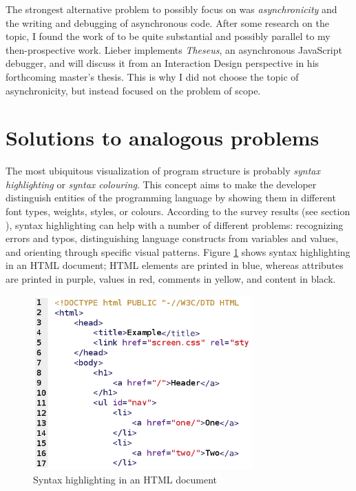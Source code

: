 The strongest alternative problem to possibly focus on was
\emph{asynchronicity} and the writing and debugging of asynchronous
code. After some research on the topic, I found the work of
 to be quite substantial and possibly parallel to my
then-prospective work. Lieber implements \emph{Theseus}, an asynchronous
JavaScript debugger, and will discuss it from an Interaction Design
perspective in his forthcoming master’s thesis. This is why I did not
choose the topic of asynchronicity, but instead focused on the problem
of scope.

\section{Solutions to analogous problems}\label{similar}

The most ubiquitous visualization of program structure is probably
\emph{syntax highlighting} or \emph{syntax colouring}. This concept aims
to make the developer distinguish entities of the programming language
by showing them in different font types, weights, styles, or colours.
According to the survey results (see section
), syntax highlighting can help with a number
of different problems: recognizing errors and typos, distinguishing
language constructs from variables and values, and orienting through
specific visual patterns. Figure \ref{fig:syntaxhighlighting} shows
syntax highlighting in an HTML document; HTML elements are printed in
blue, whereas attributes are printed in purple, values in red, comments
in yellow, and content in black.

\begin{figure}[htbp]
\centering
\includegraphics[keepaspectratio,width=0.75\textwidth,height=0.75\textheight]{img/syntax_highlighting.png}
\caption{Syntax highlighting in an HTML document}
\label{fig:syntaxhighlighting}
\end{figure}

